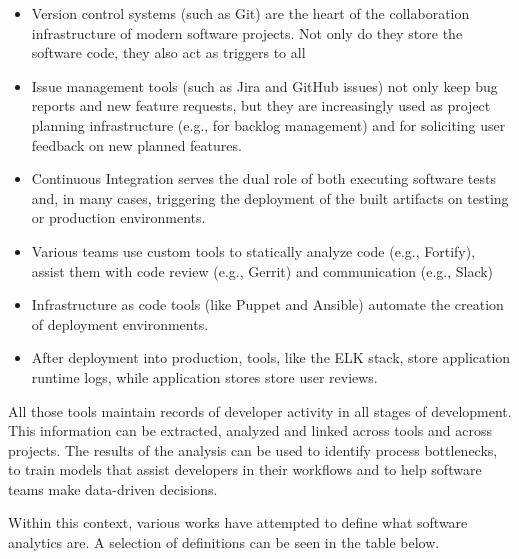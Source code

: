 \documentclass[]{book}
\begin{document}
\begin{itemize}
\item
  Version control systems (such as Git) are the heart of the
  collaboration infrastructure of modern software projects. Not only do
  they store the software code, they also act as triggers to all
\item
  Issue management tools (such as Jira and GitHub issues) not only keep
  bug reports and new feature requests, but they are increasingly used
  as project planning infrastructure (e.g., for backlog management) and
  for soliciting user feedback on new planned features.
\item
  Continuous Integration serves the dual role of both executing software
  tests and, in many cases, triggering the deployment of the built
  artifacts on testing or production environments.
\item
  Various teams use custom tools to statically analyze code (e.g.,
  Fortify), assist them with code review (e.g., Gerrit) and
  communication (e.g., Slack)
\item
  Infrastructure as code tools (like Puppet and Ansible) automate the
  creation of deployment environments.
\item
  After deployment into production, tools, like the ELK stack, store
  application runtime logs, while application stores store user reviews.
\end{itemize}

All those tools maintain records of developer activity in all stages of
development. This information can be extracted, analyzed and linked
across tools and across projects. The results of the analysis can be
used to identify process bottlenecks, to train models that assist
developers in their workflows and to help software teams make
data-driven decisions.

Within this context, various works have attempted to define what
software analytics are. A selection of definitions can be seen in the
table below.
\end{document}
